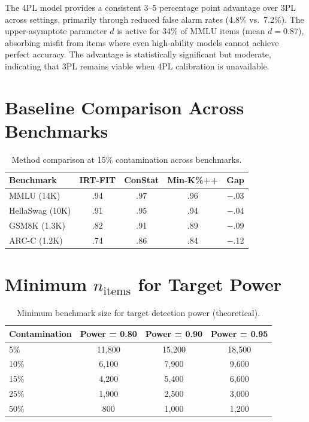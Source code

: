 \documentclass[11pt,a4paper]{article}
\begin{document}
The 4PL model provides a consistent 3--5 percentage point advantage over 3PL across settings, primarily through reduced false alarm rates (4.8\% vs.\ 7.2\%).
The upper-asymptote parameter $d$ is active for 34\% of MMLU items (mean $d = 0.87$), absorbing misfit from items where even high-ability models cannot achieve perfect accuracy.
The advantage is statistically significant but moderate, indicating that 3PL remains viable when 4PL calibration is unavailable.

\section{Baseline Comparison Across Benchmarks}
\label{app:baselines-cross}

\begin{table}[h]
\centering
\small
\caption{Method comparison at 15\% contamination across benchmarks.}
\label{tab:baselines-cross}
\begin{tabular}{lcccc}
\toprule
\textbf{Benchmark} & \textbf{IRT-FIT} & \textbf{ConStat} & \textbf{Min-K\%++} & \textbf{Gap} \\
\midrule
MMLU (14K) & .94 & .97 & .96 & $-$.03 \\
HellaSwag (10K) & .91 & .95 & .94 & $-$.04 \\
GSM8K (1.3K) & .82 & .91 & .89 & $-$.09 \\
ARC-C (1.2K) & .74 & .86 & .84 & $-$.12 \\
\bottomrule
\end{tabular}
\end{table}

\section{Minimum $n_{\text{items}}$ for Target Power}
\label{app:min-n}

\begin{table}[h]
\centering
\small
\caption{Minimum benchmark size for target detection power (theoretical).}
\label{tab:min-n}
\begin{tabular}{lccc}
\toprule
\textbf{Contamination} & \textbf{Power = 0.80} & \textbf{Power = 0.90} & \textbf{Power = 0.95} \\
\midrule
5\% & 11{,}800 & 15{,}200 & 18{,}500 \\
10\% & 6{,}100 & 7{,}900 & 9{,}600 \\
15\% & 4{,}200 & 5{,}400 & 6{,}600 \\
25\% & 1{,}900 & 2{,}500 & 3{,}000 \\
50\% & 800 & 1{,}000 & 1{,}200 \\
\bottomrule
\end{tabular}
\end{table}
\end{document}
